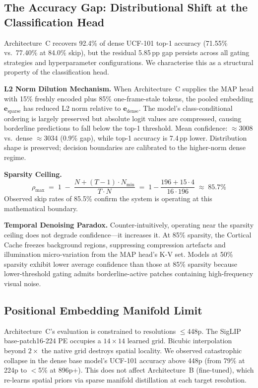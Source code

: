 \documentclass{article}
\begin{document}
\subsection{The Accuracy Gap: Distributional Shift at the Classification Head}
\label{sec:limit-accuracy-gap}

Architecture~C recovers 92.4\% of dense UCF-101 top-1 accuracy (71.55\%
vs.\ 77.40\% at 84.0\% skip), but the residual 5.85\,pp gap persists
across all gating strategies and hyperparameter configurations. We
characterise this as a structural property of the classification head.

\textbf{L2 Norm Dilution Mechanism.} When Architecture~C supplies the MAP
head with 15\% freshly encoded plus 85\% one-frame-stale tokens, the pooled
embedding $\mathbf{e}_{\text{sparse}}$ has reduced L2 norm relative to
$\mathbf{e}_{\text{dense}}$. The model's class-conditional ordering is
largely preserved but absolute logit values are compressed, causing
borderline predictions to fall below the top-1 threshold. Mean confidence:
$\approx$3008 vs.\ dense $\approx$3034 (0.9\% gap), while top-1 accuracy
is 7.4\,pp lower. Distribution shape is preserved; decision boundaries are
calibrated to the higher-norm dense regime.

\textbf{Sparsity Ceiling.}
\begin{equation}
\label{eq:sparsity-ceiling}
\rho_{\max} \;=\; 1 \;-\; \frac{N + (T-1)\cdot N_{\min}}{T \cdot N}
\;=\; 1 - \frac{196 + 15 \cdot 4}{16 \cdot 196} \;\approx\; 85.7\%
\end{equation}
Observed skip rates of 85.5\% confirm the system is operating at this
mathematical boundary.

\textbf{Temporal Denoising Paradox.} Counter-intuitively, operating near
the sparsity ceiling does not degrade confidence---it increases it. At 85\%
sparsity, the Cortical Cache freezes background regions, suppressing
compression artefacts and illumination micro-variation from the MAP head's
K-V set. Models at 50\% sparsity exhibit lower average confidence than those
at 85\% sparsity because lower-threshold gating admits borderline-active
patches containing high-frequency visual noise.

\subsection{Positional Embedding Manifold Limit}
\label{sec:limit-pe-manifold}

Architecture~C's evaluation is constrained to resolutions $\leq$448p.
The SigLIP base-patch16-224 PE occupies a $14{\times}14$ learned grid.
Bicubic interpolation beyond $2\times$ the native grid destroys spatial
locality. We observed catastrophic collapse in the dense base model's
UCF-101 accuracy above 448p (from 79\% at 224p to $<$5\% at 896p+).
This does not affect Architecture~B (fine-tuned), which re-learns spatial
priors via sparse manifold distillation at each target resolution.
\end{document}
